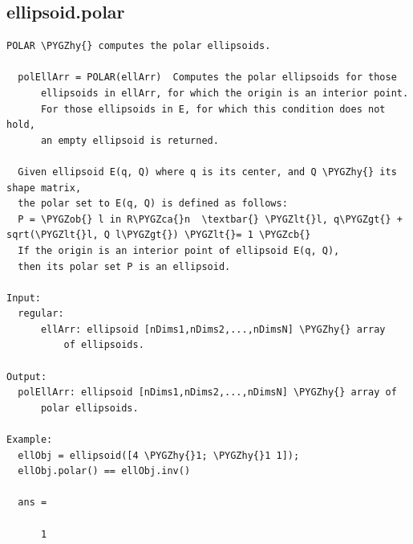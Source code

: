 \documentclass[letterpaper,10pt,english]{sphinxmanual}
\def\PYGZob{\char`\{}
\def\PYGZcb{\char`\}}
\def\PYGZca{\char`\^}
\def\PYGZlt{\char`\<}
\def\PYGZgt{\char`\>}
\def\PYGZhy{\char`\-}
\begin{document}
\subsection{ellipsoid.polar}
\label{chap_functions:ellipsoid-polar}
\begin{Verbatim}[commandchars=\\\{\}]
POLAR \PYGZhy{} computes the polar ellipsoids.

  polEllArr = POLAR(ellArr)  Computes the polar ellipsoids for those
      ellipsoids in ellArr, for which the origin is an interior point.
      For those ellipsoids in E, for which this condition does not hold,
      an empty ellipsoid is returned.

  Given ellipsoid E(q, Q) where q is its center, and Q \PYGZhy{} its shape matrix,
  the polar set to E(q, Q) is defined as follows:
  P = \PYGZob{} l in R\PYGZca{}n  \textbar{} \PYGZlt{}l, q\PYGZgt{} + sqrt(\PYGZlt{}l, Q l\PYGZgt{}) \PYGZlt{}= 1 \PYGZcb{}
  If the origin is an interior point of ellipsoid E(q, Q),
  then its polar set P is an ellipsoid.

Input:
  regular:
      ellArr: ellipsoid [nDims1,nDims2,...,nDimsN] \PYGZhy{} array
          of ellipsoids.

Output:
  polEllArr: ellipsoid [nDims1,nDims2,...,nDimsN] \PYGZhy{} array of
      polar ellipsoids.

Example:
  ellObj = ellipsoid([4 \PYGZhy{}1; \PYGZhy{}1 1]);
  ellObj.polar() == ellObj.inv()

  ans =

      1
\end{Verbatim}
\end{document}
